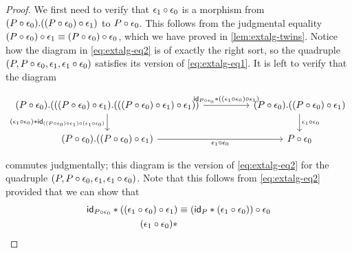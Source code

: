 \begin{proof}
We first need to verify that $\jcomp{}{\epsilon_0}{\epsilon_1}$ is a morphism
from $\ctxext{\jcomp{}{\epsilon_0}{P}}{\jcomp{}{\epsilon_1}{{}{\epsilon_0}{P}}}$
to $\jcomp{}{\epsilon_0}{P}$. This follows from the judgmental equality
$\jcomp{}{\epsilon_1}{{}{\epsilon_0}{P}}\jdeq
\jcomp{}{\epsilon_0}{{}{\epsilon_0}{P}}$, which we have proved in
\autoref{lem:extalg-twins}. Notice how the diagram in \autoref{eq:extalg-eq2} is
of exactly the right sort, so the quadruple
$(P,\jcomp{}{\epsilon_0}{P},\epsilon_1,\jcomp{}{\epsilon_0}{\epsilon_1})$
satisfies its version of \autoref{eq:extalg-eq1}. It is left to verify that the diagram
\begin{small}
\begin{equation*}
\begin{tikzcd}[column sep=huge]
\ctxext
  { \jcomp{}{\epsilon_0}{P}
    }
  { { \jcomp{}{\epsilon_1}{%
        \jcomp{}{\epsilon_0}{P}
        }
      }
    { \jcomp{}{\epsilon_1}{%
        \jcomp{}{\epsilon_1}{%
          \jcomp{}{\epsilon_0}{P}
          }
        }
      }
    } 
  \ar{r}
    { \jvcomp{}{\idtm{\jcomp{}{\epsilon_0}{P}}}{%
        \jcomp{}{\epsilon_1}{%
          \jcomp{}{\epsilon_0}{\epsilon_1}}}}
  \ar{d}[swap]{
    \jvcomp{}{\jcomp{}{\epsilon_0}{\epsilon_1}}{%
      \idtm{
        \jcomp{}{\jcomp{}{\epsilon_0}{\epsilon_1}}{%
          \jcomp{}{\epsilon_1}{%
            \jcomp{}{\epsilon_0}{P}
            }
          }
        }
      }
    }
& \ctxext
    {\jcomp{}{\epsilon_0}{P}}
    {\jcomp{}{\epsilon_1}{\jcomp{}{\epsilon_0}{P}}} 
  \ar{d}{\jcomp{}{\epsilon_0}{\epsilon_1}}
  \\
\ctxext
  {\jcomp{}{\epsilon_0}{P}}
  {\jcomp{}{\epsilon_1}{\jcomp{}{\epsilon_0}{P}}} 
  \ar{r}[swap]{\jcomp{}{\epsilon_0}{\epsilon_1}} 
& \jcomp{}{\epsilon_0}{P}
\end{tikzcd}
\end{equation*}
\end{small}
commutes judgmentally; this diagram is the version of \autoref{eq:extalg-eq2}
for the quadruple
$(P,\jcomp{}{\epsilon_0}{P},\epsilon_1,\jcomp{}{\epsilon_0}{\epsilon_1})$. Note
that this follows from \autoref{eq:extalg-eq2} provided that we can show that
\begin{align}
\jvcomp{}{\idtm{\jcomp{}{\epsilon_0}{P}}}{%
  \jcomp{}{\epsilon_1}{%
    \jcomp{}{\epsilon_0}{\epsilon_1}}}
& \jdeq
  \jcomp{}{\epsilon_0}{%
    \jvcomp{}{\idtm{P}}{\jcomp{}{\epsilon_0}{\epsilon_1}}
    }
  \label{eq:extalg-infty1}
  \\
\jvcomp{}{\jcomp{}{\epsilon_0}{\epsilon_1}}{%
}
\end{align}
\end{proof}
